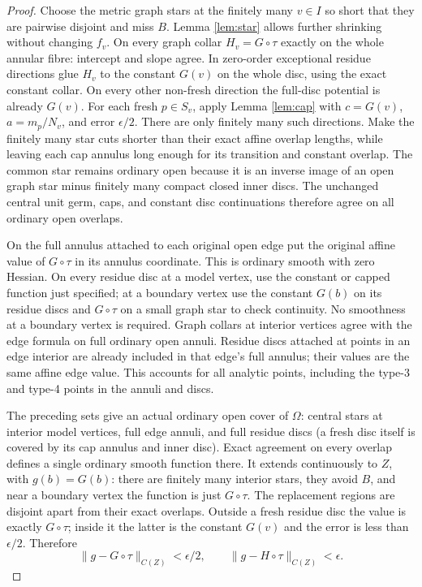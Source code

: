 \documentclass[11pt]{article}
\begin{document}
\begin{proof}
Choose the metric graph stars at the finitely many $v\in I$ so
short that they are pairwise disjoint and miss $B$. Lemma
\ref{lem:star} allows further shrinking without changing $f_v$.
On every graph collar $H_v=G\circ\tau$ exactly on the whole
annular fibre: intercept and slope agree. In zero-order exceptional
residue directions glue $H_v$ to the constant $G(v)$ on the
whole disc, using the exact constant collar. On every other
non-fresh direction the full-disc potential is already $G(v)$.
For each fresh $p\in S_v$, apply Lemma \ref{lem:cap} with
$c=G(v)$, $a=m_p/N_v$, and error $\epsilon/2$. There are only
finitely many such directions. Make the finitely many star cuts
shorter than their exact affine overlap lengths, while leaving
each cap annulus long enough for its transition and constant
overlap. The common star remains ordinary open because it is
an inverse image of an open graph star minus finitely many
compact closed inner discs. The unchanged central unit germ,
caps, and constant disc continuations therefore agree on all
ordinary open overlaps.

On the full annulus attached to each original open edge put the
original affine value of $G\circ\tau$ in its annulus coordinate.
This is ordinary smooth with zero Hessian. On every residue
disc at a model vertex, use the constant or capped function
just specified; at a boundary vertex use the constant $G(b)$
on its residue discs and $G\circ\tau$ on a small graph star
to check continuity. No smoothness at a boundary vertex is
required. Graph collars at interior vertices agree with the
edge formula on full ordinary open annuli. Residue discs
attached at points in an edge interior are already included
in that edge's full annulus; their values are the same affine
edge value. This accounts for all analytic points, including
the type-3 and type-4 points in the annuli and discs.

The preceding sets give an actual ordinary open cover of
$\Omega$: central stars at interior model vertices, full
edge annuli, and full residue discs (a fresh disc itself is
covered by its cap annulus and inner disc). Exact agreement
on every overlap defines a single ordinary smooth function
there. It extends continuously to $Z$, with $g(b)=G(b)$:
there are finitely many interior stars, they avoid $B$, and
near a boundary vertex the function is just $G\circ\tau$.
The replacement regions are disjoint apart from their exact
overlaps. Outside a fresh residue disc the value is exactly
$G\circ\tau$; inside it the latter is the constant $G(v)$
and the error is less than $\epsilon/2$. Therefore
\[
 \|g-G\circ\tau\|_{C(Z)}<\epsilon/2,
 \qquad \|g-H\circ\tau\|_{C(Z)}<\epsilon.
\]


\end{proof}
\end{document}
